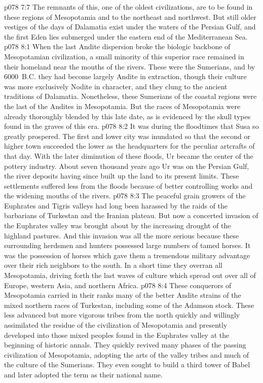\vs p078 7:7 The remnants of this, one of the oldest civilizations, are to be found in these regions of Mesopotamia and to the northeast and northwest. But still older vestiges of the days of Dalamatia exist under the waters of the Persian Gulf, and the first Eden lies submerged under the eastern end of the Mediterranean Sea.
\vs p078 8:1 When the last Andite dispersion broke the biologic backbone of Mesopotamian civilization, a small minority of this superior race remained in their homeland near the mouths of the rivers. These were the Sumerians, and by 6000~B.C. they had become largely Andite in extraction, though their culture was more exclusively Nodite in character, and they clung to the ancient traditions of Dalamatia. Nonetheless, these Sumerians of the coastal regions were the last of the Andites in Mesopotamia. But the races of Mesopotamia were already thoroughly blended by this late date, as is evidenced by the skull types found in the graves of this era.
\vs p078 8:2 It was during the floodtimes that Susa so greatly prospered. The first and lower city was inundated so that the second or higher town succeeded the lower as the headquarters for the peculiar artcrafts of that day. With the later diminution of these floods, Ur became the center of the pottery industry. About seven thousand years ago Ur was on the Persian Gulf, the river deposits having since built up the land to its present limits. These settlements suffered less from the floods because of better controlling works and the widening mouths of the rivers.
\pc \vs p078 8:3 The peaceful grain growers of the Euphrates and Tigris valleys had long been harassed by the raids of the barbarians of Turkestan and the Iranian plateau. But now a concerted invasion of the Euphrates valley was brought about by the increasing drought of the highland pastures. And this invasion was all the more serious because these surrounding herdsmen and hunters possessed large numbers of tamed horses. It was the possession of horses which gave them a tremendous military advantage over their rich neighbors to the south. In a short time they overran all Mesopotamia, driving forth the last waves of culture which spread out over all of Europe, western Asia, and northern Africa.
\vs p078 8:4 These conquerors of Mesopotamia carried in their ranks many of the better Andite strains of the mixed northern races of Turkestan, including some of the Adamson stock. These less advanced but more vigorous tribes from the north quickly and willingly assimilated the residue of the civilization of Mesopotamia and presently developed into those mixed peoples found in the Euphrates valley at the beginning of historic annals. They quickly revived many phases of the passing civilization of Mesopotamia, adopting the arts of the valley tribes and much of the culture of the Sumerians. They even sought to build a third tower of Babel and later adopted the term as their national name.
